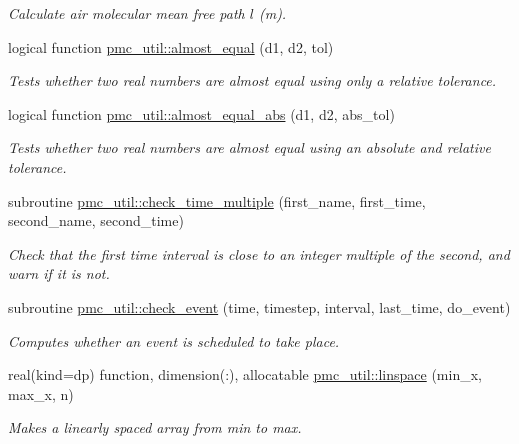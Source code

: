 \begin{DoxyCompactItemize}
\begin{DoxyCompactList}\small\item\em Calculate air molecular mean free path $l$ (m). \end{DoxyCompactList}\item 
logical function \mbox{\hyperlink{namespacepmc__util_a7bc605f9cb5389d88d233bcecfbfc858}{pmc\+\_\+util\+::almost\+\_\+equal}} (d1, d2, tol)
\begin{DoxyCompactList}\small\item\em Tests whether two real numbers are almost equal using only a relative tolerance. \end{DoxyCompactList}\item 
logical function \mbox{\hyperlink{namespacepmc__util_a5952e4909aad7ccdcdc8ac308c7bf3f8}{pmc\+\_\+util\+::almost\+\_\+equal\+\_\+abs}} (d1, d2, abs\+\_\+tol)
\begin{DoxyCompactList}\small\item\em Tests whether two real numbers are almost equal using an absolute and relative tolerance. \end{DoxyCompactList}\item 
subroutine \mbox{\hyperlink{namespacepmc__util_a479916629132db9682beccf0d90a0113}{pmc\+\_\+util\+::check\+\_\+time\+\_\+multiple}} (first\+\_\+name, first\+\_\+time, second\+\_\+name, second\+\_\+time)
\begin{DoxyCompactList}\small\item\em Check that the first time interval is close to an integer multiple of the second, and warn if it is not. \end{DoxyCompactList}\item 
subroutine \mbox{\hyperlink{namespacepmc__util_a2c1ad3f0be48f08a1b308538f8d42540}{pmc\+\_\+util\+::check\+\_\+event}} (time, timestep, interval, last\+\_\+time, do\+\_\+event)
\begin{DoxyCompactList}\small\item\em Computes whether an event is scheduled to take place. \end{DoxyCompactList}\item 
real(kind=dp) function, dimension(\+:), allocatable \mbox{\hyperlink{namespacepmc__util_a173493cd6763f490fd73dcc0d3ae701b}{pmc\+\_\+util\+::linspace}} (min\+\_\+x, max\+\_\+x, n)
\begin{DoxyCompactList}\small\item\em Makes a linearly spaced array from min to max. \end{DoxyCompactList}\item 

\end{DoxyCompactItemize}
